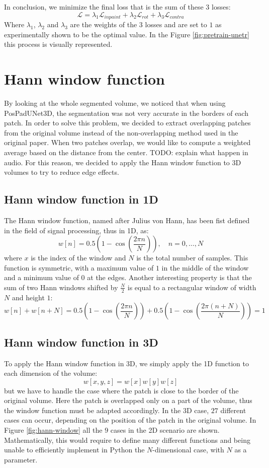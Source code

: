 In conclusion, we minimize the final loss that is the sum of these 3 losses:
$$
\mathcal{L} = \lambda_1\mathcal{L}_{inpaint} + \lambda_2\mathcal{L}_{rot} +
\lambda_3\mathcal{L}_{contra}
$$
Where $\lambda_1$, $\lambda_2$ and $\lambda_3$ are the weights of the 3 losses
and are set to $1$ as experimentally shown to be the optimal value. In the
Figure \ref{fig:pretrain-unetr} this process is visually represented.

\section{Hann window function}
By looking at the whole segmented volume, we noticed that when using
PosPadUNet3D, the segmentation was not very accurate in the borders of each
patch. In order to solve this problem, we decided to extract overlapping patches
from the original volume instead of the non-overlapping method used in the
original paper. When two patches overlap, we would like to compute a weighted
average based on the distance from the center.
TODO: explain what happen in audio.
For this reason, we decided to apply the Hann window function to 3D volumes to
try to reduce edge effects.
\subsection{Hann window function in 1D}
The Hann window function, named after Julius von Hann, has been fist defined in
the field of signal processing, thus in 1D, as:
$$
w[n] = 0.5(1 - \cos(\frac{2\pi n}{N})), \quad n = 0, \dots, N
$$
where $x$ is the index of the window and $N$ is the total number of samples.
This function is symmetric, with a maximum value of $1$ in the middle of the
window and a minimum value of $0$ at the edges.
Another interesting property is that the sum of two Hann windows shifted by $\frac{N}{2}$
is equal to a rectangular window of width $N$ and height $1$:
\begin{equation}
  \label{eq:hannisone}
  w[n] + w[n + N] = 0.5(1 - \cos(\frac{2\pi n}{N})) + 0.5(1 - \cos(\frac{2\pi (n + N)}{N} )) = 1
\end{equation}
\subsection{Hann window function in 3D}
To apply the Hann window function in 3D, we simply apply the 1D function to each
dimension of the volume:
\begin{equation}
  w[x, y, z] = w[x]w[y]w[z]
\end{equation}
but we have to handle the case where the patch is close to the border of the
original volume. Here the patch is overlapped only on a part of the volume, thus
the window function must be adapted accordingly. In the 3D case, $27$ different
cases can occur, depending on the position of the patch in the original volume.
In Figure \ref{fig:hann-window} all the $9$ cases in the 2D scenario are shown.
Mathematically, this would require to define many different functions and being
unable to efficiently implement in Python the $N$-dimensional case, with $N$ as
a parameter.

